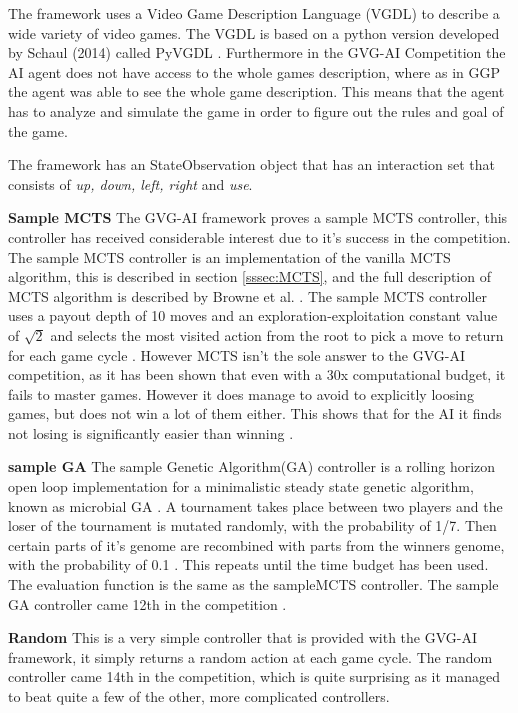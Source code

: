 \documentclass[journal]{IEEEtran}
\begin{document}
		
		The framework uses a Video Game Description Language (VGDL) to describe a wide variety of video games. The VGDL is based on a python version developed by Schaul (2014) called PyVGDL \cite{schuster2015mcts}. Furthermore in the GVG-AI Competition the AI agent does not have access to the whole games description, where as in GGP the agent was able to see the whole game description. This means that the agent has to analyze and simulate the game in order to figure out the rules and goal of the game.
		
		
		The framework has an StateObservation object that has an interaction set that consists of \textit{up, down, left, right} and \textit{use}.


		
		\textbf{Sample MCTS} \label{sssec:sampleMCTS}
			The GVG-AI framework proves a sample MCTS controller, this controller has received considerable interest due to it's success in the competition. 
			The sample MCTS controller is an implementation of the vanilla MCTS algorithm, this is described in section \ref{sssec:MCTS}, and the full description of MCTS algorithm is described by Browne et al. \cite{browne2012survey}.
			The sample MCTS controller uses a payout depth of 10 moves and an exploration-exploitation constant value of $\sqrt{2}$ and selects the most visited action from the root to pick a move to return for each game cycle \cite{perez20162014}.
			However MCTS isn't the sole answer to the GVG-AI competition, as it has been shown that even with a 30x computational budget, it fails to master games. However it does manage to avoid to explicitly loosing games, but does not win a lot of them either. This shows that for the AI it finds not losing is significantly easier than winning \cite{nelson2016investigating}.

		\textbf{sample GA}
			The sample Genetic Algorithm(GA) controller is a rolling horizon open loop implementation for a minimalistic steady state genetic algorithm, known as microbial GA \cite{harvey2009microbial}.
			A tournament takes place between two players and the loser of the tournament is mutated randomly, with the probability of 1/7. Then certain parts of it's genome are recombined with parts from the winners genome, with the probability of 0.1 \cite{perez20162014}. 
			This repeats until the time budget has been used. The evaluation function is the same as the sampleMCTS controller. 
			The sample GA controller came 12th in the competition \cite{perez20162014}.
			

		\textbf{Random}
			This is a very simple controller that is provided with the GVG-AI framework, it simply returns a random action at each game cycle.
			The random controller came 14th in the competition, which is quite surprising as it managed to beat quite a few of the other, more complicated controllers.
\end{document}
